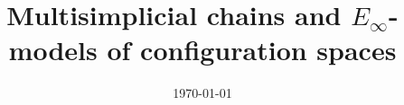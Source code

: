 \documentclass{amsart}
\title{Multisimplicial chains and $E_\infty$-models of configuration spaces}
\date{\today}
\begin{document}
	
	\maketitle
	\tableofcontents
	
	
	
	
	
	
	\sloppy
	\printbibliography
	\todos
%	
\end{document}
